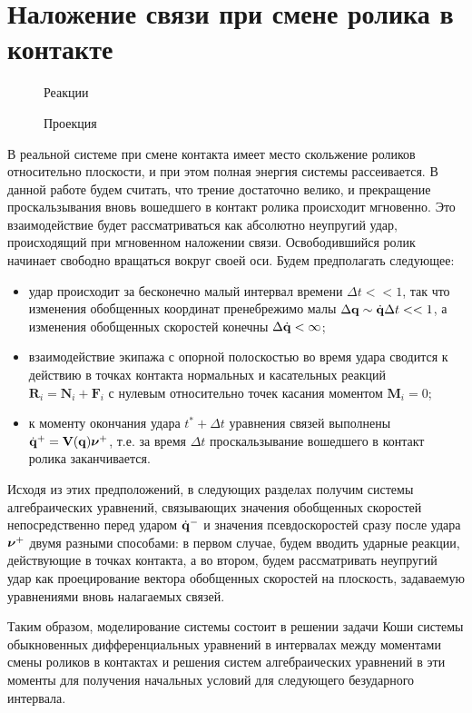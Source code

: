 \section{Наложение связи при смене ролика в контакте}

\begin{figure}[h]
        \centering
        \caption{Реакции}
        \label{fig:react}
    \endminipage
        \centering
        \caption{Проекция}
        \label{fig:project}
    \endminipage
\end{figure}

В реальной системе при смене контакта имеет место скольжение роликов относительно плоскости, и при этом полная энергия системы рассеивается. В данной работе будем считать, что трение достаточно велико, и прекращение проскальзывания вновь вошедшего в контакт ролика происходит мгновенно. Это взаимодействие будет рассматриваться как абсолютно неупругий удар, происходящий при мгновенном наложении связи.
Освободившийся ролик начинает свободно вращаться вокруг своей оси.
Будем предполагать следующее:
\begin{itemize}
    \item удар происходит за бесконечно малый интервал времени $\Delta t << 1$, так что изменения обобщенных координат пренебрежимо малы $\Delta \mathbf{q} \sim \dot{\mathbf{q}}\Delta t << 1$, а изменения обобщенных скоростей конечны $\Delta \dot{\mathbf{q}} < \infty$;
    \item взаимодействие экипажа с опорной полоскостью во время удара сводится к действию в точках контакта нормальных и касательных реакций $\mathbf{R}_i = \mathbf{N}_i + \mathbf{F}_i$ с нулевым относительно точек касания моментом $\mathbf{M}_i = 0$;
    \item к моменту окончания удара $t^*+\Delta t$ уравнения связей выполнены $\dot{\mathbf{q}}^+ = \mathbf{V}(\mathbf{q})\boldsymbol{\mathbf{\nu}}^+$, т.е. за время $\Delta t$ проскальзывание вошедшего в контакт ролика заканчивается.
\end{itemize}


Исходя из этих предположений, в следующих разделах получим системы алгебраических уравнений, связывающих значения обобщенных скоростей непосредственно перед ударом $\dot{\mathbf{q}}^-$ и значения псевдоскоростей сразу после удара $\boldsymbol{\mathbf{\nu}}^+$ двумя разными способами: в первом случае, будем  вводить ударные реакции, действующие в точках контакта, а во втором, будем рассматривать неупругий удар как проецирование вектора обобщенных скоростей на плоскость, задаваемую уравнениями вновь налагаемых связей.

Таким образом, моделирование системы состоит в решении задачи Коши системы обыкновенных дифференциальных уравнений в интервалах между моментами смены роликов в контактах и решения систем алгебраических уравнений в эти моменты для получения начальных условий для следующего безударного интервала.
